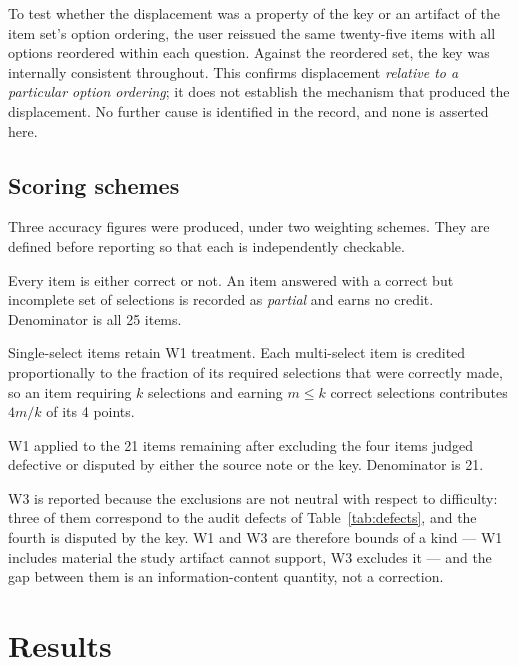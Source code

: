 \documentclass[11pt]{article}
\begin{document}
To test whether the displacement was a property of the key or an artifact of
the item set's option ordering, the user reissued the same twenty-five items
with all options reordered within each question. Against the reordered set,
the key was internally consistent throughout. This confirms displacement
\emph{relative to a particular option ordering}; it does not establish the
mechanism that produced the displacement. No further cause is identified in
the record, and none is asserted here.

\subsection{Scoring schemes}
\label{sec:scoring}

Three accuracy figures were produced, under two weighting schemes. They are
defined before reporting so that each is independently checkable.

\begin{description}[style=nextline,leftmargin=0pt]
\item[W1 --- Strict, all-or-nothing.] Every item is either correct or not.
      An item answered with a correct but incomplete set of selections is
      recorded as \emph{partial} and earns no credit. Denominator is all
      25 items.
\item[W2 --- Selection-weighted.] Single-select items retain W1 treatment.
      Each multi-select item is credited proportionally to the fraction of
      its required selections that were correctly made, so an item
      requiring $k$ selections and earning $m \leq k$ correct selections
      contributes $4m/k$ of its 4 points.
\item[W3 --- Strict, restricted.] W1 applied to the 21 items remaining after
      excluding the four items judged defective or disputed by either the
      source note or the key. Denominator is 21.
\end{description}

W3 is reported because the exclusions are not neutral with respect to
difficulty: three of them correspond to the audit defects of
Table~\ref{tab:defects}, and the fourth is disputed by the key. W1 and W3
are therefore bounds of a kind --- W1 includes material the study artifact
cannot support, W3 excludes it --- and the gap between them is an
information-content quantity, not a correction.

\section{Results}
\label{sec:results}
\end{document}
